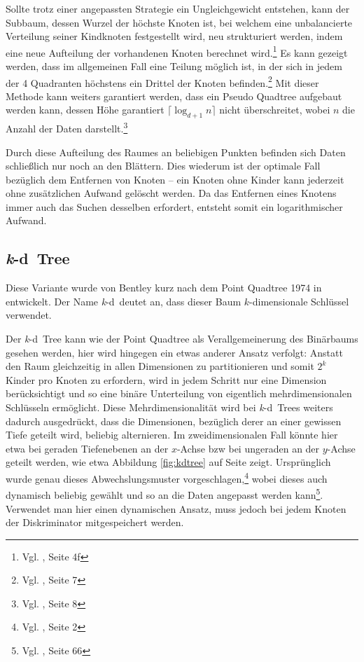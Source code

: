 \documentclass[%
			paper=a4,%
			DIV12,
			liststotoc,
			bibtotoc,
			draft=false,%
			titlepage
			]{scrartcl}
\newcommand{\zit}[3]{#1 \cite{#2}, #3}
\newcommand{\footzit}[3]{\footnote{\zit{#1}{#2}{#3}}}
\newcommand{\kd}{\mbox{\textit{k}-d}}
\begin{document}
Sollte trotz einer angepassten Strategie ein Ungleichgewicht entstehen, kann der Subbaum, dessen Wurzel der höchste Knoten ist, bei welchem eine unbalancierte Verteilung seiner Kindknoten festgestellt wird, neu strukturiert werden, indem eine neue Aufteilung der vorhandenen Knoten berechnet wird.\footzit{Vgl.}{DBLP:journals/acta/OvermarsL82}{Seite 4f} %
Es kann gezeigt werden, dass im allgemeinen Fall eine Teilung möglich ist, in der sich in jedem der 4 Quadranten höchstens ein Drittel der Knoten befinden.\footzit{Vgl.}{DBLP:journals/acta/OvermarsL82}{Seite 7} %
Mit dieser Methode kann weiters garantiert werden, dass ein Pseudo Quadtree aufgebaut werden kann, dessen Höhe garantiert $\lceil \log_{d+1} n\rceil$ nicht überschreitet, wobei $n$ die Anzahl der Daten darstellt.\footzit{Vgl.}{DBLP:journals/acta/OvermarsL82}{Seite 8}

Durch diese Aufteilung des Raumes an beliebigen Punkten befinden sich Daten schließlich nur noch an den Blättern. Dies wiederum ist der optimale Fall bezüglich dem Entfernen von Knoten -- ein Knoten ohne Kinder kann jederzeit ohne zusätzlichen Aufwand gelöscht werden. Da das Entfernen eines Knotens immer auch das Suchen desselben erfordert, entsteht somit ein logarithmischer Aufwand.


\subsection{\kd\ Tree}
Diese Variante wurde von Bentley kurz nach dem Point Quadtree 1974 in \cite{Bentley:1975} entwickelt. Der Name \kd\ deutet an, dass dieser Baum $k$-dimensionale Schlüssel verwendet. 

Der \kd\ Tree kann wie der Point Quadtree als Verallgemeinerung des Binärbaums gesehen werden, hier wird hingegen ein etwas anderer Ansatz verfolgt:
Anstatt den Raum gleichzeitig in allen Dimensionen zu partitionieren und somit $2^k$ Kinder pro Knoten zu erfordern, wird in jedem Schritt nur eine Dimension berücksichtigt und so eine binäre Unterteilung von eigentlich mehrdimensionalen Schlüsseln ermöglicht.
Diese Mehrdimensionalität wird bei \kd\ Trees weiters dadurch ausgedrückt, dass die Dimensionen, bezüglich derer an einer gewissen Tiefe geteilt wird, beliebig alternieren.
Im zweidimensionalen Fall könnte hier etwa bei geraden Tiefenebenen an der $x$-Achse bzw bei ungeraden an der $y$-Achse geteilt werden, wie etwa Abbildung \ref{fig:kdtree} auf Seite \pageref{fig:kdtree} zeigt.
Ursprünglich wurde genau dieses Abwechslungsmuster vorgeschlagen,\footzit{Vgl.}{Bentley:1975}{Seite 2}
wobei dieses auch dynamisch beliebig gewählt und so an die Daten angepasst werden kann\footzit{Vgl.}{Samet90}{Seite 66}.
Verwendet man hier einen dynamischen Ansatz, muss jedoch bei jedem Knoten der Diskriminator mitgespeichert werden.
\end{document}
